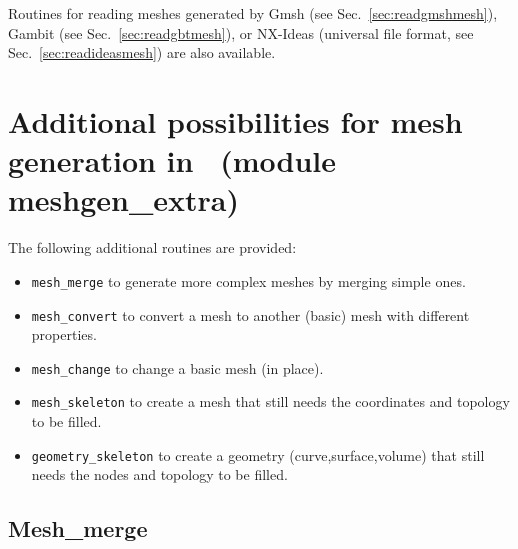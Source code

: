 Routines for reading 
meshes generated by Gmsh (see Sec.~\ref{sec:readgmshmesh}), 
Gambit (see Sec.~\ref{sec:readgbtmesh}),
or NX-Ideas (universal file format, see Sec.~\ref{sec:readideasmesh})
are also available.

\section{Additional possibilities for mesh generation in \tfem\
       (module meshgen\_extra)}
\label{sec:meshgenextra}

The following additional routines are provided:
\begin{itemize}
\item \texttt{mesh\_merge} to generate more complex meshes by merging simple ones.
\item \texttt{mesh\_convert} to convert a mesh to another (basic) mesh with
     different properties.
\item \texttt{mesh\_change} to change a basic mesh (in place). 
\item \texttt{mesh\_skeleton} to create a mesh that still needs the coordinates
and topology to be filled.
\item \texttt{geometry\_skeleton} to create a geometry (curve,surface,volume)
that still needs the nodes and topology to be filled.
\end{itemize}

\subsection{Mesh\_merge}


